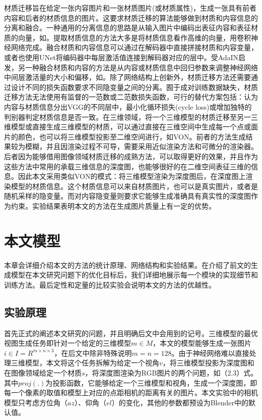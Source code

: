 \documentclass[UTF8,openany,AutoFakeBold,AutoFakeSlant,cs4size]{ctexbook}
\begin{document}
材质迁移旨在给定一张内容图片和一张材质图片(或材质属性)，生成一张具有前者内容和后者的材质信息的图片。这要求材质迁移的算法能够做到材质和内容信息的分离和融合。一种通用的分离信息的思路是从输入图片中编码出表征内容和表征材质的向量，如\cite{zheng2019joint, BeautyGlow, Li2018BeautyGANIF, Wu2019DisentanglingCA}。提取材质信息的方法大多是将材质信息看作高维的向量，用卷积神经网络完成。融合材质和内容信息可以通过在解码器中直接拼接材质和内容变量，或者也使用UNet\cite{vunet2018}将编码器中每层激活值连接到解码器对应的层中。受AdaIN\cite{huang2017adain}启发，另一种融合材质和内容的方法是从内容或材质信息中回归参数来调整神经网络中间层激活量的大小和偏移，如\cite{zhu2019sean, park2019SPADE}。除了网络结构上创新外，材质迁移方法还需要通过设计不同的损失函数要求不同隐变量之间的分离。囿于成对训练数据缺失，材质迁移方法无法使用有监督的一范数或二范数损失函数，可行的替代方案包括：认为内容与材质信息分出VGG的不同层中\cite{7780634}，最小化循环损失(cycle loss)\cite{Lu2017ConditionalCF}或增加独特的判别器判定材质信息是否一致\cite{pix2pixSC2019, ma2017pose}。在三维领域，将一个三维模型的材质迁移至另一三维模型或直接生成三维模型的材质，可以通过直接在三维空间中生成每一个点或面片的颜色\cite{cmrKanazawa18}，也可以将三维模型投影至二维空间进行，如VON\cite{VON}。前者的方法生成结果较为模糊，并且因渲染过程不可导，需要采用近似渲染方法和可微分的渲染器\cite{Kato_2018_CVPR}。后者因为能够借用图像领域材质迁移的成熟方法，可以取得更好的效果，并且作为这些方法中常用的承载三维信息的深度图，也能够很好的在二维空间表征三维的信息。因此本文采用类似VON的模式：将三维模型渲染为深度图后，在深度图上渲染模型的材质信息。这个材质信息可以来自材质图片，也可以是真实图片，或者是随机采样的隐变量。而对内容隐变量则要求它能够生成准确具有真实性的深度图作为约束。实验结果表明本文的方法在生成图片质量上有一定的优势。



\clearpage

\chapter{本文模型}

本章会详细介绍本文的方法的统计原理、网络结构和实验结果。在介绍了前文的生成模型在本文研究问题下的优化目标后，我们详细地展示每一个模块的实现细节和训练方法。最后定性和定量的比较实验会说明本文的方法的优越性。

\section{实验原理}

首先正式的阐述本文研究的问题，并且明确后文中会用到的记号。三维模型的最优视图生成任务即针对一个给定的三维模型$m \in M$，本文的模型能够生成一张图片$i \in I = R^{m \times n \times 3}$，在后文中除非特殊说明$m = n = 128$。由于神经网络难以直接处理三维模型，本文将这个任务拆解为给定一个视角$v$，将三维模型投影为深度图和在图像领域给定一个材质$s$，将深度图渲染为RGB图片的两个问题，如（2.3）式。其中$proj(.)$为投影函数，它能够给定一个三维模型和视角，生成一个深度图，即每一个像素的取值和模型上对应的点距相机的距离有关的图片。本文实验中的相机模型只考虑方位角（$az$）、仰角（$el$）的变化，其他的参数都预设为Blender中的默认值。
\end{document}
